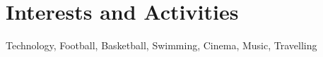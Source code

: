 \documentclass[a4paper,10pt]{article} %
\begin{document}

\section{Interests and Activities}

Technology, Football, Basketball, Swimming, Cinema, Music, Travelling\\
\end{document}
